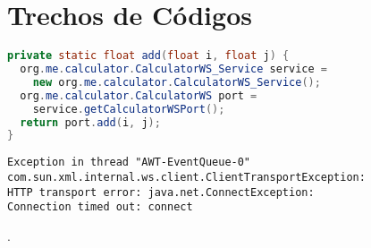 %

\chapter{Trechos de Códigos}

\begin{lstlisting}[caption=Operação de chamada ao WebService,label=cod:add,language=Java]
private static float add(float i, float j) {
  org.me.calculator.CalculatorWS_Service service = 
    new org.me.calculator.CalculatorWS_Service();
  org.me.calculator.CalculatorWS port = 
    service.getCalculatorWSPort();
  return port.add(i, j);
}
\end{lstlisting}





\begin{lstlisting}[caption=Erro de transporte HTTP,label=cod:httperror]
Exception in thread "AWT-EventQueue-0" 
com.sun.xml.internal.ws.client.ClientTransportException: 
HTTP transport error: java.net.ConnectException: 
Connection timed out: connect
\end{lstlisting}

.










